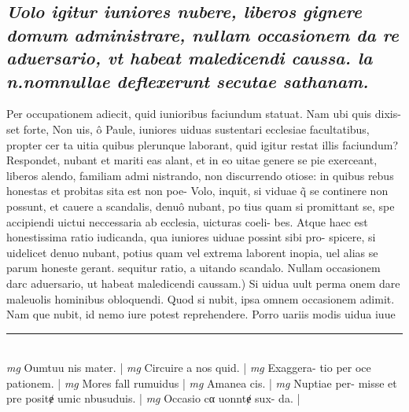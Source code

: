 \documentclass{article}
\begin{document}
\begin{pages}
\subsection*{\textit{Uolo igitur iuniores nubere, liberos gignere domum administrare, nullam occasionem da re aduersario, vt habeat maledicendi caussa. la n.nomnullae deflexerunt secutae sathanam. }}\pstart Per occupationem adiecit, quid iunioribus faciundum statuat. Nam ubi quis dixis- set forte, Non uis, ô Paule, iuniores uiduas sustentari ecclesiae facultatibus, propter cer ta uitia quibus plerunque laborant, quid igitur restat illis faciundum? Respondet, nubant et mariti eas alant, et in eo uitae genere se pie exerceant, liberos alendo, familiam admi nistrando, non discurrendo otiose: in quibus rebus honestas et probitas sita est non poe-  Volo, inquit, si viduae q̃ se continere non possunt, et cauere a scandalis, denuô nubant, po tius quam si promittant se, spe accipiendi uictui neccessaria ab ecclesia, uicturas coeli- bes. Atque haec est honestissima ratio iudicanda, qua iuniores uiduae possint sibi pro- spicere, si uidelicet denuo nubant, potius quam vel extrema laborent inopia, uel alias se parum honeste gerant. sequitur ratio, a uitando scandalo.  \pend\pstart Nullam occasionem darc aduersario, ut habeat maledicendi caussam.) Si uidua uult perma  onem dare maleuolis hominibus obloquendi. Quod si nubit, ipsa omnem occasionem adimit. Nam que nubit, id nemo iure potest reprehendere. Porro uariis modis uidua iuue  \pend
\vspace{0.5cm}\noindent
\vspace{0.2cm}\rule{1cm}{0.2pt}\\ 
\hspace{0.2cm}\textit{mg}
\footnotesize Oumtuu nis mater. 
\normalsize| 
\hspace{0.2cm}\textit{mg}
\footnotesize Circuire a nos quid. 
\normalsize| 
\hspace{0.2cm}\textit{mg}
\footnotesize Exaggera- tio per oce pationem. 
\normalsize| 
\hspace{0.2cm}\textit{mg}
\footnotesize Mores fall rumuidus 
\normalsize| 
\hspace{0.2cm}\textit{mg}
\footnotesize Amanea cis. 
\normalsize| 
\hspace{0.2cm}\textit{mg}
\footnotesize Nuptiae per- misse et pre positɇ umic nbusuduis. 
\normalsize| 
\hspace{0.2cm}\textit{mg}
\footnotesize Occasio cα uonntɇ sux- da. 
\normalsize| 

\end{pages}
\end{document}
